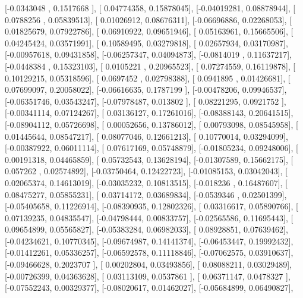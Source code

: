 \documentclass{article}
\begin{document}
       [-0.0343048 ,  0.1517668 ],
       [ 0.04774358,  0.15878045],
       [-0.04019281,  0.08878944],
       [ 0.0788256 ,  0.05839513],
       [ 0.01026912,  0.08676311],
       [-0.06696886,  0.02268053],
       [ 0.01825679,  0.07922786],
       [ 0.06910922,  0.09651946],
       [ 0.05163961,  0.15665506],
       [ 0.04245424,  0.03571991],
       [ 0.10589495,  0.03279818],
       [ 0.02657934,  0.03170987],
       [-0.00957618,  0.09431858],
       [-0.06257347,  0.04094873],
       [-0.0814019 ,  0.11637217],
       [-0.0448384 ,  0.15323103],
       [ 0.0105221 ,  0.20965523],
       [ 0.07274559,  0.16119878],
       [ 0.10129215,  0.05318596],
       [ 0.0697452 ,  0.02798388],
       [ 0.0941895 ,  0.01426681],
       [ 0.07699097,  0.20058022],
       [-0.06616635,  0.1787199 ],
       [-0.00478206,  0.09946537],
       [-0.06351746,  0.03543247],
       [-0.07978487,  0.013802  ],
       [ 0.08221295,  0.0921752 ],
       [-0.00341114,  0.07124267],
       [ 0.03136127,  0.17261016],
       [-0.08388143,  0.20641515],
       [-0.08904112,  0.05726698],
       [ 0.00052656,  0.13786012],
       [ 0.00793098,  0.08545958],
       [ 0.01445644,  0.08547217],
       [ 0.08077046,  0.12661213],
       [ 0.10770014,  0.03294099],
       [-0.00387922,  0.06011114],
       [ 0.07617169,  0.05748879],
       [-0.01805234,  0.09248006],
       [ 0.00191318,  0.04465859],
       [ 0.05732543,  0.13628194],
       [-0.01307589,  0.15662175],
       [ 0.057262  ,  0.02574892],
       [-0.03750464,  0.12422723],
       [-0.01085153,  0.03042043],
       [ 0.02065374,  0.14613019],
       [-0.03035232,  0.10813515],
       [-0.018236  ,  0.16487607],
       [ 0.08475277,  0.05855231],
       [ 0.03714172,  0.03689834],
       [-0.0539346 ,  0.02501399],
       [-0.05405658,  0.11226914],
       [-0.08390935,  0.12802326],
       [ 0.03316617,  0.05890766],
       [ 0.07139235,  0.04835547],
       [-0.04798444,  0.00833757],
       [-0.02565586,  0.11695443],
       [ 0.09654899,  0.05565827],
       [-0.05383284,  0.06982033],
       [ 0.08928851,  0.07639462],
       [-0.04234621,  0.10770345],
       [-0.09674987,  0.14141374],
       [-0.06453447,  0.19992432],
       [-0.01412261,  0.05336257],
       [-0.06592578,  0.11118846],
       [-0.07062575,  0.03910637],
       [-0.09466628,  0.2023707 ],
       [ 0.00202804,  0.03493856],
       [ 0.08088211,  0.03029489],
       [-0.00726399,  0.04363628],
       [ 0.03113109,  0.0537861 ],
       [ 0.06371147,  0.0478327 ],
       [-0.07552243,  0.00329377],
       [-0.08020617,  0.01462027],
       [-0.05684899,  0.06490827],
\end{document}
